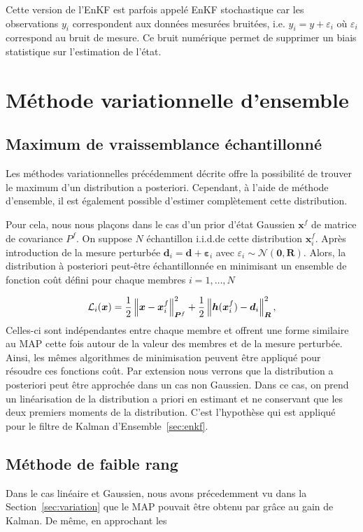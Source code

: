 Cette version de l'EnKF est parfois appelé EnKF stochastique car les observations $y_i$ correspondent aux données mesurées bruitées, i.e. $y_i = y + \varepsilon_i$ où $\varepsilon_i$ correspond au bruit de mesure. Ce bruit numérique permet de supprimer un biais statistique sur l'estimation de l'état.

\section{Méthode variationnelle d'ensemble}

\subsection{Maximum de vraissemblance échantillonné}
Les méthodes variationnelles précédemment décrite offre la possibilité de trouver le maximum d'un distribution a posteriori. Cependant, à l'aide de méthode d'ensemble, il est également possible d'estimer complètement cette distribution.

Pour cela, nous nous plaçons dans le cas d'un prior d'état Gaussien $\bm x^f$ de matrice de covariance $P^f$. On suppose $N$ échantillon i.i.d.de cette distribution $\bm x^f_i$. Après introduction de la mesure perturbée $\bm d_i = \bm d + \bm \varepsilon_i$ avec $\varepsilon_i \sim \mathcal{N}(\bm 0, \bm R)$. Alors, la distribution à posteriori peut-être échantillonnée en minimisant un ensemble de fonction coût défini pour chaque membres $i = 1, \dots, N$

\begin{equation*}
    \mathcal L_i(\bm x) = \frac12 \left\lVert \bm x -\bm x^f_i \right\rVert^2_{\bm P^f} + \frac12 \left\lVert \bm h(\bm x^f_i) - \bm d_i \right\rVert_{\bm R}^2,
\end{equation*}Celles-ci sont indépendantes entre chaque membre et offrent une forme similaire au MAP cette fois autour de la valeur des membres et de la mesure perturbée. Ainsi, les mêmes algorithmes de minimisation peuvent être appliqué pour résoudre ces fonctions coût.
Par extension nous verrons que la distribution a posteriori peut être approchée dans un cas non Gaussien. Dans ce cas, on prend un linéarisation de la distribution a priori en estimant et ne conservant que les deux premiers moments de la distribution. C'est l'hypothèse qui est appliqué pour le filtre de Kalman d'Ensemble~\ref{sec:enkf}.

\subsection{Méthode de faible rang}
Dans le cas linéaire et Gaussien, nous avons précedemment vu dans la Section~\ref{sec:variation} que le MAP pouvait être obtenu par grâce au gain de Kalman. De même, en approchant les

